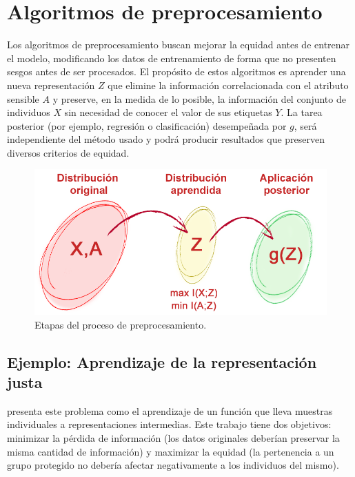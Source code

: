 \documentclass[oneside,openright,titlepage,numbers=noenddot,openany,headinclude,footinclude=true,
cleardoublepage=empty,abstractoff,BCOR=5mm,paper=a4,fontsize=12pt,main=spanish]{scrreprt}
\begin{document}
\section{Algoritmos de preprocesamiento}

Los algoritmos de preprocesamiento buscan mejorar la equidad antes de entrenar el modelo, modificando los datos de entrenamiento de forma que no presenten sesgos antes de ser procesados. El propósito de estos algoritmos es aprender una nueva representación $Z$ que elimine la información correlacionada con el atributo sensible $A$ y preserve, en la medida de lo posible, la información del conjunto de individuos $X$ sin necesidad de conocer el valor de sus etiquetas $Y$. La tarea posterior (por ejemplo, regresión o clasificación) desempeñada por $g$, será independiente del método usado y podrá producir resultados que preserven diversos criterios de equidad.\\

\begin{figure}[h]
	\centering
	\includegraphics[width=12.1cm]{preprocesado.png}
	\caption{Etapas del proceso de preprocesamiento.}
    \label{fig:preprocessing}
\end{figure}

\subsection{Ejemplo: Aprendizaje de la representación justa}

\cite{fairrepresentation2013} presenta  este problema como el aprendizaje de un función que lleva muestras individuales a representaciones intermedias. Este trabajo tiene dos objetivos: minimizar la pérdida de información (los datos originales deberían preservar la misma cantidad de información) y maximizar la equidad (la pertenencia a un grupo protegido no debería afectar negativamente a los individuos del mismo). 
\end{document}
